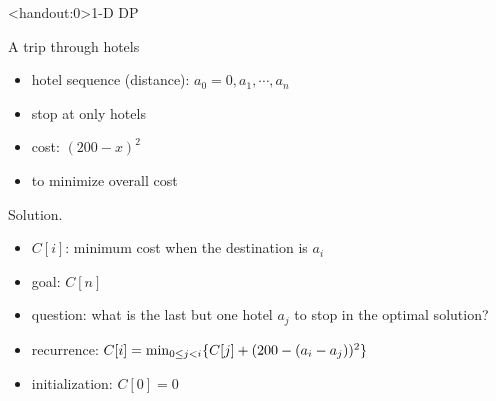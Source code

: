 \begin{frame}<handout:0>{1-D DP}
  \begin{exampleblock}{A trip through hotels }
    \begin{itemize}
      \item hotel sequence (distance): $a_{0} = 0, a_{1}, \cdots, a_{n}$
      \item stop at only hotels
      \item cost: $(200 - x)^{2}$ 
      \item to minimize overall cost
    \end{itemize}
  \end{exampleblock}

  \begin{block}{Solution.}
    \begin{itemize}
      \item $C[i]$: minimum cost when the destination is $a_{i}$
      \item goal: $C[n]$
      \item question: what is the last but one hotel $a_{j}$ to stop in the optimal solution?
      \item recurrence: $C[i] = \min_{0 \le j < i} \{C[j] + (200 - (a_{i} - a_{j}))^{2}\}$
      \item initialization: $C[0] = 0$
    \end{itemize}
  \end{block}
\end{frame}
